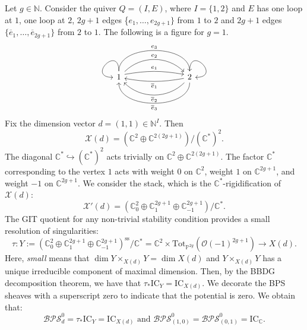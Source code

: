 \documentclass [11pt,oneside,a4paper,mathscr]{amsart}
\theoremstyle{definition}
\newcommand{\X}{\mathscr{X}}
\begin{document}
Let $g\in \mathbb{N}$.
Consider the quiver $Q=(I,E)$, where $I=\{1,2\}$ and $E$ has one loop at $1$, one loop at $2$, $2g+1$ edges \{$e_1,\ldots, e_{2g+1}\}$ from $1$ to $2$ and $2g+1$ edges $\{\overline{e}_1,\ldots, \overline{e}_{2g+1}\}$ from $2$ to $1$. The following is a figure for $g=1$.
\begin{equation*}
    \begin{tikzcd}
 1 \arrow[out=90, in=180, loop, swap] \arrow[rrr, bend left=45, "e_2"]
 \arrow[rrr, bend left=90, "e_3"]
\arrow[rrr, shift left=1, bend left=10, "e_1"] &&&2 \arrow[out=90, in=0, loop, swap] \arrow[lll, bend left=10, "\overline{e}_1"] \arrow[lll, bend left=45, "\overline{e}_2"] \arrow[lll, bend left=90, "\overline{e}_3"]
 \end{tikzcd}
\end{equation*}
Fix the dimension vector $d=(1,1)\in \mathbb{N}^I$. 
Then \[\X(d)=\left(\mathbb{C}^2\oplus \mathbb{C}^{2(2g+1)}\right)\big/(\mathbb{C}^*)^2.\]
The diagonal $\mathbb{C}^*\hookrightarrow (\mathbb{C}^*)^2$ acts trivially on $\mathbb{C}^2\oplus \mathbb{C}^{2(2g+1)}$. The factor $\mathbb{C}^*$ corresponding to the vertex $1$ acts with weight $0$ on $\mathbb{C}^2$, weight $1$ on $\mathbb{C}^{2g+1}$, and weight $-1$ on $\mathbb{C}^{2g+1}$. We consider the stack, which is the $\mathbb{C}^*$-rigidification of $\X(d)$:  
\[\X'(d)=\left(\mathbb{C}^2_0\oplus \mathbb{C}^{2g+1}_1\oplus \mathbb{C}^{2g+1}_{-1}\right)\big/\mathbb{C}^*.\]
The GIT quotient for any non-trivial stability condition provides a small resolution of singularities:
\[\tau\colon Y:=\left(\mathbb{C}^2_0\oplus \mathbb{C}^{2g+1}_1\oplus \mathbb{C}^{2g+1}_{-1}\right)^{\mathrm{ss}}\big/\mathbb{C}^*=\mathbb{C}^2\times\mathrm{Tot}_{\mathbb{P}^{2g}}\left(\mathcal{O}(-1)^{2g+1}\right)\to X(d).\]
Here, \textit{small} means that $\dim Y\times_{X(d)} Y=\dim X(d)$ and $Y\times_{X(d)} Y$ has a unique irreducible component of maximal dimension.
Then, by the BBDG decomposition theorem, we have that $\tau_*\mathrm{IC}_{Y}=\mathrm{IC}_{X(d)}$.
We decorate the BPS sheaves with a superscript zero to indicate that the potential is zero.
We obtain that:
\begin{equation}\label{computations}
    \mathcal{BPS}^0_d=\tau_*\mathrm{IC}_{Y}=\mathrm{IC}_{X(d)}\text{ and }\mathcal{BPS}^0_{(1,0)}=\mathcal{BPS}^0_{(0,1)}=\mathrm{IC}_{\mathbb{C}}.
\end{equation}
\end{document}
